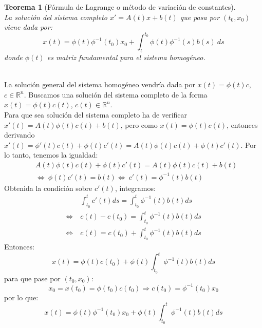 \documentclass{article}
\makeatletter
\theoremstyle{theorem-style}  %
\newtheorem{theorem}{Teorema}[section]  %
\theoremstyle{definition-style}
\theoremstyle{example-style}
\renewenvironment{proof}[1][\proofname]{\par
	\pushQED{\qed}%
	\normalfont \topsep6\p@\@plus6\p@\relax
	\list{}{%
		\settowidth{\leftmargin}{\quad:\hskip\labelsep}%
		\setlength{\labelwidth}{0pt}%
		\setlength{\itemindent}{-\leftmargin}%
	}%
	\item[\hskip\labelsep\itshape#1\@addpunct{:}]\ignorespaces
}{%
	\popQED\endlist\@endpefalse
}
\makeatother
\begin{document}
\begin{theorem}[Fórmula de Lagrange o método de variación de constantes]\label{lagrange-formula}\ \\
	La solución del sistema completo $x' = A(t)x + b(t)$ que pasa por $(t_0, x_0)$ viene dada por:
	\[x(t) = \phi(t) \phi^{-1}(t_0) x_0 + \int_{t}^{t_0}\phi(t) \phi^{-1}(s) b(s) \ ds\]
	donde $\phi(t)$ es matriz fundamental para el sistema homogéneo.
\end{theorem}
\begin{proof}\ \\
	La solución general del sistema homogéneo vendría dada por $x(t) = \phi (t) c$, $c \in \mathbb{R}^n$. Buscamos una solución del sistema completo de la forma $x(t) = \phi (t) c(t)$, $c(t) \in \mathbb{R}^n$.\\
	Para que sea solución del sistema completo ha de verificar $ x'(t)=A(t)\phi(t)c(t)+b(t) $, pero como $ x(t)=  \phi (t) c(t) $, entonces derivando $ x'(t)= \phi'(t)c(t) + \phi(t)c'(t)=A(t)\phi(t)c(t) + \phi(t)c'(t)$. Por lo tanto, tenemos la igualdad:
	\begin{align*}
		&A(t)\phi(t)c(t) + \phi(t)c'(t)= A(t)\phi(t)c(t) + b(t) \\
		&\Leftrightarrow \ \phi(t)c'(t) = b(t) \Leftrightarrow \ c'(t) = \phi^{-1}(t) b(t)
	\end{align*}
	Obtenida la condición sobre $ c'(t) $, integramos:
	\begin{align*}
	& \int_{t_0}^{t} c'(t) ds = \int_{t_0}^{t} \phi^{-1}(t) b(t) ds\\
	\Leftrightarrow \ &c(t) - c(t_0) = \int_{t_0}^{t} \phi^{-1}(t) b(t) ds\\
	\Leftrightarrow \ &c(t) = c(t_0) + \int_{t_0}^{t} \phi^{-1}(t) b(t) ds
	\end{align*}
	Entonces:
	\[x(t) = \phi(t) c(t_0) + \phi(t) \int_{t_0}^{t} \phi^{-1}(t) b(t) ds\]
	para que pase por $(t_0, x_0)$:
	\[x_0 = x(t_0) = \phi (t_0) c(t_0) \Rightarrow c(t_0) = \phi^{-1}(t_0) x_0 \] 
	por lo que:
	\[x(t) = \phi(t) \phi^{-1}(t_0) x_0 + \phi(t) \int_{t_0}^{t} \phi^{-1}(t) b(t) ds\]
\end{proof}
\pagebreak
\end{document}
